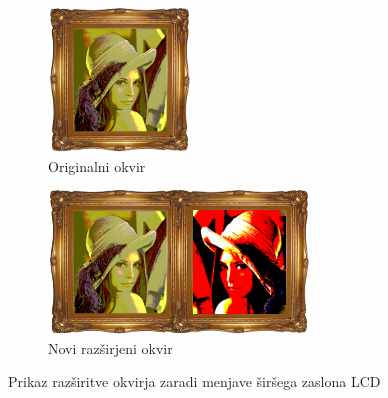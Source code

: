 \documentclass[a4paper, 12pt]{book}
\begin{document}
\begin{figure}[!ht]
    \centering
    \begin{subfigure}[b]{0.33\textwidth}
        \includegraphics[width=\textwidth]{frame1}
        \caption{Originalni okvir}
    \end{subfigure}
    \begin{subfigure}[b]{0.6\textwidth}
        \includegraphics[width=\textwidth]{frame2}
        \caption{Novi razširjeni okvir}
        \label{fig:frame2}
    \end{subfigure}
    \caption{Prikaz razširitve okvirja zaradi menjave širšega zaslona LCD}
\end{figure}
\end{document}
